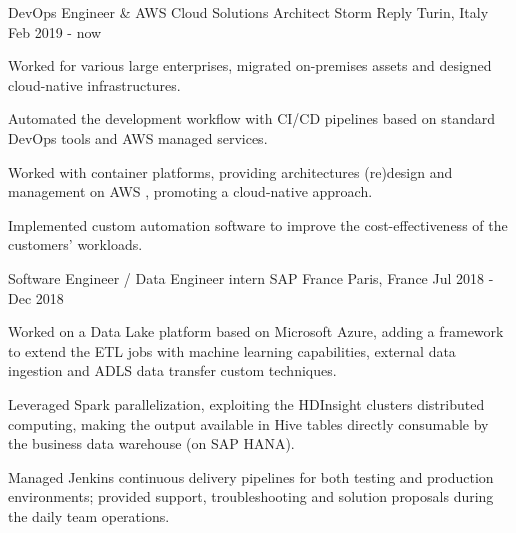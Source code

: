 

\begin{cventries}

  \cventry
    {DevOps Engineer \& AWS Cloud Solutions Architect} %
    {Storm Reply} %
    {Turin, Italy} %
    {Feb 2019 - now} %
    {
        \begin{cvitems} %
            \item {Worked for various large enterprises, migrated on-premises assets and designed cloud-native infrastructures.}
            \item {Automated the development workflow with CI/CD pipelines based on standard DevOps tools and AWS managed services.}
            \item {Worked with container platforms, providing architectures (re)design and management on AWS , promoting a cloud-native approach.}
            \item {Implemented custom automation software to improve the cost-effectiveness of the customers' workloads.}
        \end{cvitems}
    }

  \cventry
    {Software Engineer / Data Engineer intern} %
    {SAP France} %
    {Paris, France} %
    {Jul 2018 - Dec 2018} %
    {
      \begin{cvitems} %
        \item {Worked on a Data Lake platform based on Microsoft Azure, adding a framework to extend the ETL jobs with machine learning capabilities, external data ingestion and ADLS data transfer custom techniques.}
        \item {Leveraged Spark parallelization, exploiting the HDInsight clusters distributed computing, making the output available in Hive tables directly consumable by the business data warehouse (on SAP HANA).}
        \item {Managed Jenkins continuous delivery pipelines for both testing and production environments; provided support, troubleshooting and solution proposals during the daily team operations.}
      \end{cvitems}
    }
\end{cventries}
